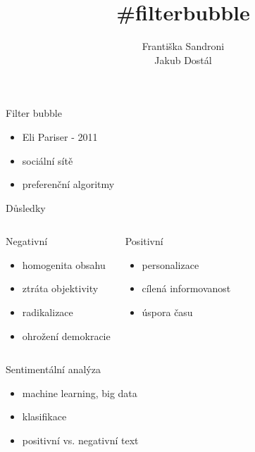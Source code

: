 \documentclass[notheorems,12pt]{beamer}
\title[]{\#filterbubble}
\date{}
\author{Františka Sandroni\\
        Jakub Dostál}
\institute{}
\begin{document}
\maketitle
\begin{frame}{Filter bubble}
\begin{itemize}
    \item Eli Pariser - 2011
    \item sociální sítě
    \item preferenční algoritmy
\end{itemize}
\end{frame}
\begin{frame}{Důsledky}
\begin{columns}
	\column{6cm}
	\begin{block}{Negativní}
		\begin{itemize}
			\item homogenita obsahu
            \item ztráta objektivity
            \item radikalizace
            \item ohrožení demokracie
		\end{itemize}
	\end{block}
	\column{6cm}
	\begin{block}{Positivní}
		\begin{itemize}
			\item personalizace
            \item cílená informovanost
            \item úspora času
		\end{itemize}
	\end{block}
\end{columns}
\end{frame}
\begin{frame}{Sentimentální analýza}
\begin{itemize}
    \item machine learning, big data
    \item klasifikace
    \item positivní vs. negativní text
\end{itemize}
\end{frame}
\end{document}
